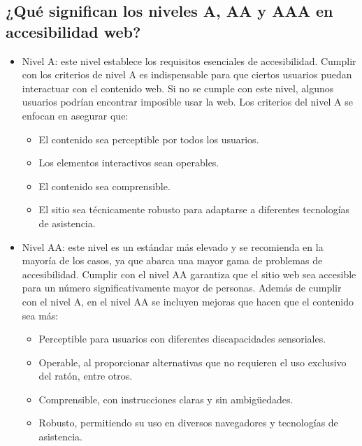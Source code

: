\documentclass[]{article}
\begin{document}
\subsection*{¿Qué significan los niveles A, AA y AAA en accesibilidad web?}
\begin{itemize}
	\item Nivel A: este nivel establece los requisitos esenciales de accesibilidad. Cumplir con los criterios de nivel A es indispensable para que ciertos usuarios puedan interactuar con el contenido web. Si no se cumple con este nivel, algunos usuarios podrían encontrar imposible usar la web. Los criterios del nivel A se enfocan en asegurar que:
	\begin{itemize}
		\item El contenido sea perceptible por todos los usuarios.
		\item Los elementos interactivos sean operables.
		\item El contenido sea comprensible.
		\item El sitio sea técnicamente robusto para adaptarse a diferentes tecnologías de asistencia.
	\end{itemize}
	
	\item Nivel AA: este nivel es un estándar más elevado y se recomienda en la mayoría de los casos, ya que abarca una mayor gama de problemas de accesibilidad. Cumplir con el nivel AA garantiza que el sitio web sea accesible para un número significativamente mayor de personas. Además de cumplir con el nivel A, en el nivel AA se incluyen mejoras que hacen que el contenido sea más:
	\begin{itemize}
		\item Perceptible para usuarios con diferentes discapacidades sensoriales.
		\item Operable, al proporcionar alternativas que no requieren el uso exclusivo del ratón, entre otros.
		\item Comprensible, con instrucciones claras y sin ambigüedades.
		\item Robusto, permitiendo su uso en diversos navegadores y tecnologías de asistencia.
	\end{itemize}
	

\end{itemize}
\end{document}
